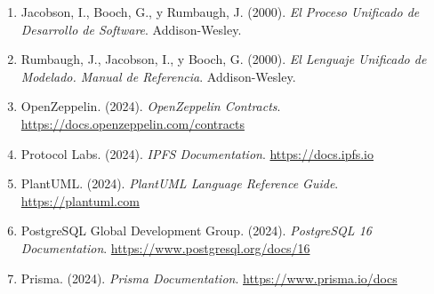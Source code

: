 \documentclass[11pt, a4paper]{article}
\begin{document}
\begin{enumerate}
    \item Jacobson, I., Booch, G., y Rumbaugh, J. (2000). \textit{El Proceso Unificado de Desarrollo de Software}. Addison-Wesley.
    \item Rumbaugh, J., Jacobson, I., y Booch, G. (2000). \textit{El Lenguaje Unificado de Modelado. Manual de Referencia}. Addison-Wesley.
    \item OpenZeppelin. (2024). \textit{OpenZeppelin Contracts}. \url{https://docs.openzeppelin.com/contracts}
    \item Protocol Labs. (2024). \textit{IPFS Documentation}. \url{https://docs.ipfs.io}
    \item PlantUML. (2024). \textit{PlantUML Language Reference Guide}. \url{https://plantuml.com}
    \item PostgreSQL Global Development Group. (2024). \textit{PostgreSQL 16 Documentation}. \url{https://www.postgresql.org/docs/16}
    \item Prisma. (2024). \textit{Prisma Documentation}. \url{https://www.prisma.io/docs}
\end{enumerate}
\end{document}
